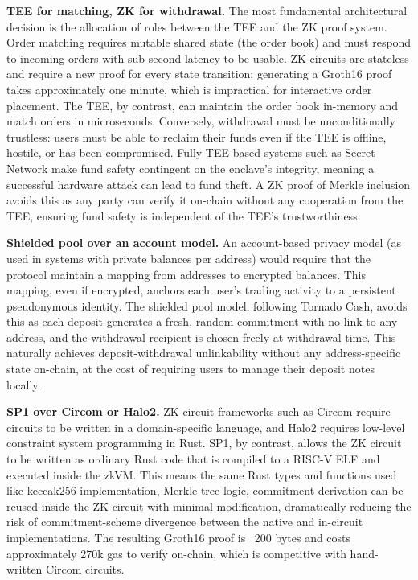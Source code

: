 \documentclass[12pt,a4paper]{article}
\begin{document}
\textbf{TEE for matching, ZK for withdrawal.} The most fundamental architectural decision is the allocation of roles between the TEE and the ZK proof system. Order matching requires mutable shared state (the order book) and must respond to incoming orders with sub-second latency to be usable. ZK circuits are stateless and require a new proof for every state transition; generating a Groth16 proof takes approximately one minute, which is impractical for interactive order placement. The TEE, by contrast, can maintain the order book in-memory and match orders in microseconds. Conversely, withdrawal must be unconditionally trustless: users must be able to reclaim their funds even if the TEE is offline, hostile, or has been compromised. Fully TEE-based systems such as Secret Network make fund safety contingent on the enclave's integrity, meaning a successful hardware attack can lead to fund theft. A ZK proof of Merkle inclusion avoids this as any party can verify it on-chain without any cooperation from the TEE, ensuring fund safety is independent of the TEE's trustworthiness.

\textbf{Shielded pool over an account model.} An account-based privacy model (as used in systems with private balances per address) would require that the protocol maintain a mapping from addresses to encrypted balances. This mapping, even if encrypted, anchors each user's trading activity to a persistent pseudonymous identity. The shielded pool model, following Tornado Cash, avoids this as each deposit generates a fresh, random commitment with no link to any address, and the withdrawal recipient is chosen freely at withdrawal time. This naturally achieves deposit-withdrawal unlinkability without any address-specific state on-chain, at the cost of requiring users to manage their deposit notes locally.

\textbf{SP1 over Circom or Halo2.} ZK circuit frameworks such as Circom require circuits to be written in a domain-specific language, and Halo2 requires low-level constraint system programming in Rust. SP1, by contrast, allows the ZK circuit to be written as ordinary Rust code that is compiled to a RISC-V ELF and executed inside the zkVM. This means the same Rust types and functions used like keccak256 implementation, Merkle tree logic, commitment derivation can be reused inside the ZK circuit with minimal modification, dramatically reducing the risk of commitment-scheme divergence between the native and in-circuit implementations. The resulting Groth16 proof is ~200 bytes and costs approximately 270k gas to verify on-chain, which is competitive with hand-written Circom circuits.
\end{document}
